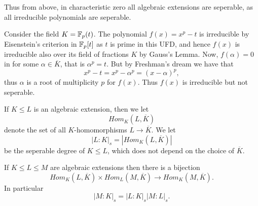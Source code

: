 \documentclass[twoside, a4paper, 10pt]{amsart}
\begin{document}
Thus from above, in characteristic zero all algebraic extensions are seperable, as all irreducible polynomials are seperable.

\begin{eg} Consider the field $K = \mathbb{F}_p(t)$. The polynomial $f(x) = x^p - t$ is irreducible by Eisenstein's criterion in $\mathbb{F}_p[t]$ as $t$ is prime in this UFD, and hence $f(x)$ is irreducible also over its field of fractions $K$ by Gauss's Lemma. Now, $f(\alpha) = 0$ in for some $\alpha \in \overline{K}$, that is $\alpha^p = t$. But by Freshman's dream we have that $$x^p - t = x^p - \alpha^p = (x-\alpha)^p,$$ thus $\alpha$ is a root of multiplicity $p$ for $f(x)$. Thus $f(x)$ is irreducible but not seperable. \end{eg}

\begin{mydef} If $K \leq L$ is an algebraic extension, then we let $$Hom_K(L, \overline{K})$$ denote the set of all $K$-homomorphisms $L \to \overline{K}$. We let $$|L:K|_s = |Hom_K(L, \overline{K})|$$ be the seperable degree of $K \leq L$, which does not depend on the choice of $\overline{K}$.

\end{mydef}

\begin{prop} If $K \leq L \leq M$ are algebraic extensions then there is a bijection $$Hom_K(L, \overline{K}) \times Hom_L(M, \overline{K}) \to Hom_K(M, \overline{K}).$$ In particular $$|M:K|_s = |L:K|_s |M:L|_s.$$

\end{prop}
\end{document}
